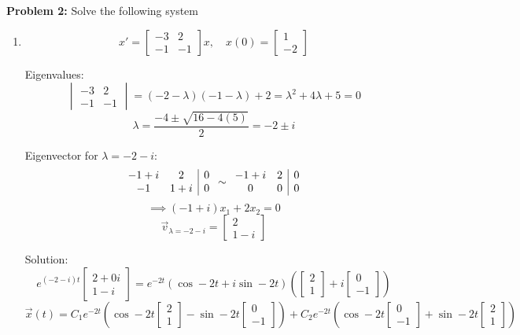 \documentclass[12pt]{article}
\begin{document}
\textbf{Problem 2:} Solve the following system
\begin{enumerate}
    \item 
    \[x' = \begin{bmatrix}
        -3 & 2\\
        -1 & -1
    \end{bmatrix}x, \quad x(0) = \begin{bmatrix}
        1\\-2
    \end{bmatrix}\]

    Eigenvalues:
    \[\begin{vmatrix}
        -3 & 2\\
        -1 & -1
    \end{vmatrix} = (-2 - \lambda)(-1 - \lambda) + 2 = \lambda^2 + 4\lambda + 5 = 0\]
    \[\lambda = \frac{-4 \pm \sqrt{16 - 4(5)}}{2} = -2 \pm i\]

    Eigenvector for $\lambda = -2 - i$:
   \[ \begin{array}{c c | c}
        -1 + i & 2 & 0\\
        -1 & 1 + i & 0
    \end{array} \sim \begin{array}{c c | c}
        -1 + i & 2 & 0\\
        0 & 0 & 0
    \end{array}\]
    \[\implies (-1 + i)x_1 + 2x_2 = 0\]
    \[\vec{v}_{\lambda = -2 - i} = \begin{bmatrix}
        2\\
        1 - i
    \end{bmatrix}\]

    Solution:
    \[e^{(-2 - i)t} \begin{bmatrix}
        2 + 0i\\ 1 - i
    \end{bmatrix} = e^{-2t} \left(\cos -2t + i \sin -2t\right) \left(\begin{bmatrix}
        2\\
        1
    \end{bmatrix} + i \begin{bmatrix}
        0\\
        - 1
    \end{bmatrix}\right)\] 
    \[\vec{x}(t) = C_1 e^{-2t} \left(\cos -2t \begin{bmatrix}
        2\\1
    \end{bmatrix} - \sin -2t \begin{bmatrix}
        0 \\ -1
    \end{bmatrix}\right) + C_2 e^{-2t} \left(\cos -2t \begin{bmatrix}
        0\\ -1
    \end{bmatrix}+ \sin -2t \begin{bmatrix}
        2\\
        1
    \end{bmatrix}\right)\]


\end{enumerate}
\end{document}
